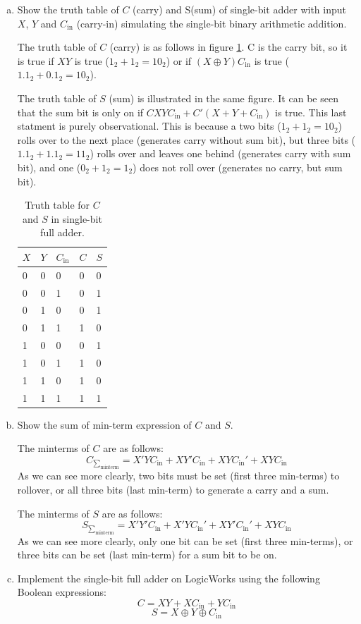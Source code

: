 \documentclass[11pt]{article}
\begin{document}
\begin{enumerate}[(a)]
	\item{
	Show the truth table of $C$ (carry) and S(sum) of single-bit adder with input $X$, $Y$ and $C_{\text{in}}$ (carry-in) simulating the single-bit binary arithmetic addition.

		The truth table of $C$ (carry) is as follows in figure \ref{fig:1a}. C is the carry bit, so it is true if $XY$ is true ($1_2+1_2=10_2$) or if $(X \oplus Y)C_{\text{in}}$ is true ($1.1_2+0.1_2=10_2$).

		The truth table of $S$ (sum) is illustrated in the same figure. It can be seen that the sum bit is only on if $CXYC_{\text{in}} + C'(X+Y+C_{\text{in}})$ is true. This last statment is purely observational. This is because a two bits ($1_2+1_2=10_2$) rolls over to the next place (generates carry without sum bit), but three bits ($1.1_2+1.1_2=11_2$) rolls over and leaves one behind (generates carry with sum bit), and one ($0_2+1_2=1_2$) does not roll over (generates no carry, but sum bit).

		\begin{table}[h]
		\centering
		\begin{tabular}{lllll}
			$X$ & $Y$ & $C_{\text{in}}$ & $C$ & $S$ \\ \hline
			0 & 0 & 0 & 0 & 0 \\
			0 & 0 & 1 & 0 & 1 \\
			0 & 1 & 0 & 0 & 1 \\
			0 & 1 & 1 & 1 & 0 \\
			1 & 0 & 0 & 0 & 1 \\
			1 & 0 & 1 & 1 & 0 \\
			1 & 1 & 0 & 1 & 0 \\
			1 & 1 & 1 & 1 & 1 \\
		\end{tabular}
		\caption{\label{fig:1a} Truth table for $C$ and $S$ in single-bit full adder.}
		\end{table}
	}
	\item{
		Show the sum of min-term expression of $C$ and $S$.

		The minterms of $C$ are as follows:
		\[
			C_{\sum_{\text{minterm}}} = X'YC_{\text{in}} + XY'C_{\text{in}} + XYC_{\text{in}}' + XYC_\text{in}
		\]
		As we can see more clearly, two bits must be set (first three min-terms) to rollover, or all three bits (last min-term) to generate a carry and a sum.

		The minterms of $S$ are as follows:
		\[
			S_{\sum_{\text{minterm}}} = X'Y'C_{\text{in}} + X'YC_{\text{in}}' + XY'C_{\text{in}}' + XYC_\text{in}
		\]
		As we can see more clearly, only one bit can be set (first three min-terms), or three bits can be set (last min-term) for a sum bit to be on.
	}
	\item{
		Implement the single-bit full adder on LogicWorks using the following Boolean expressions:
		\[
			C = XY + XC_{\text{in}} + YC_{\text{in}}
		\]
		\[
			S = X \oplus Y \oplus C_{\text{in}}
		\]

}
\end{enumerate}
\end{document}
